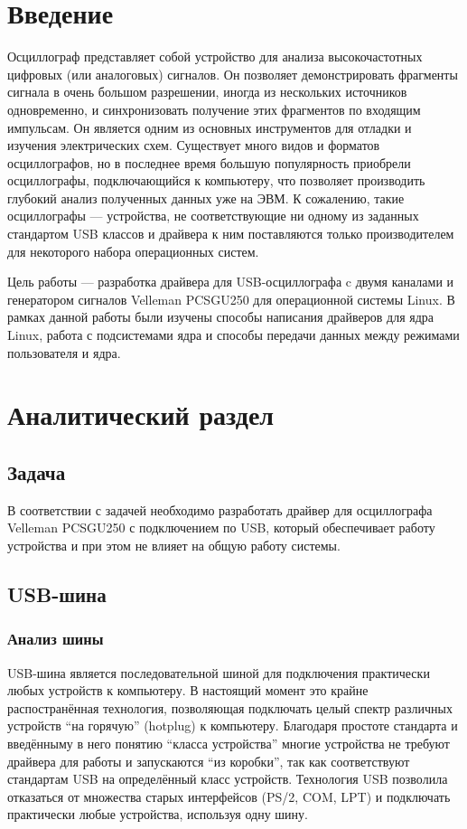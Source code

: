 \documentclass[a4paper,12pt]{report}
\numberwithin{equation}{section}
\begin{document}
\section*{Введение}
Осциллограф представляет собой устройство для анализа высокочастотных цифровых
(или аналоговых) сигналов. Он позволяет демонстрировать фрагменты сигнала в
очень большом разрешении, иногда из нескольких источников одновременно, и
синхронизовать получение этих фрагментов по входящим импульсам. Он является
одним из основных инструментов для отладки и изучения электрических схем.
Существует много видов и форматов осциллографов, но в последнее время большую
популярность приобрели осциллографы, подключающийся к компьютеру, что позволяет
производить глубокий анализ полученных данных уже на ЭВМ. К сожалению, такие
осциллографы --- устройства, не соответствующие ни одному из заданных стандартом
USB классов и драйвера к ним поставляются только производителем для некоторого
набора операционных систем.

Цель работы --- разработка драйвера для USB-осциллографа c двумя каналами и
генератором сигналов Velleman PCSGU250 для операционной системы Linux. В рамках
данной работы были изучены способы написания драйверов для ядра Linux, работа с
подсистемами ядра и способы передачи данных между режимами пользователя и
ядра.

\newpage
\section{Аналитический раздел}
\subsection{Задача}
В соответствии с задачей необходимо разработать драйвер для осциллографа
Velleman PCSGU250 с подключением по USB, который обеспечивает работу устройства
и при этом не влияет на общую работу системы.

\subsection{USB-шина}
\subsubsection{Анализ шины}
USB-шина является последовательной шиной для подключения практически любых
устройств к компьютеру. В настоящий момент это крайне распостранённая
технология, позволяющая подключать целый спектр различных устройств ``на
горячую'' (hotplug) к компьютеру. Благодаря простоте стандарта и введённыму в
него понятию ``класса устройства'' многие устройства не требуют драйвера для
работы и запускаются ``из коробки'', так как соответствуют стандартам USB на
определённый класс устройств. Технология USB позволила отказаться от множества
старых интерфейсов (PS/2, COM, LPT) и подключать практически любые устройства,
используя одну шину.
\end{document}

